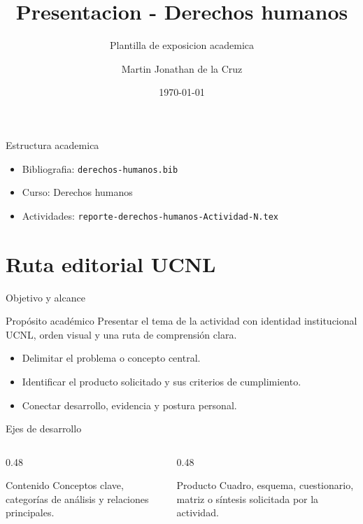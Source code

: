 ﻿\documentclass[spanish,aspectratio=169]{beamer}
\title{Presentacion - Derechos humanos}
\subtitle{Plantilla de exposicion academica}
\author{Martin Jonathan de la Cruz}
\institute{Universidad Ciudadana de Nuevo Leon}
\date{\today}
\begin{document}
\begin{frame}
  \titlepage
\end{frame}

\begin{frame}{Estructura academica}
  \begin{itemize}
    \item Bibliografia: \texttt{derechos-humanos.bib}
    \item Curso: Derechos humanos
    \item Actividades: \texttt{reporte-derechos-humanos-Actividad-N.tex}
  \end{itemize}
\end{frame}


\section{Ruta editorial UCNL}

\begin{frame}{Objetivo y alcance}
  \begin{block}{Propósito académico}
    Presentar el tema de la actividad con identidad institucional UCNL, orden visual y una ruta de comprensión clara.
  \end{block}
  \begin{itemize}
    \item Delimitar el problema o concepto central.
    \item Identificar el producto solicitado y sus criterios de cumplimiento.
    \item Conectar desarrollo, evidencia y postura personal.
  \end{itemize}
\end{frame}

\begin{frame}{Ejes de desarrollo}
  \begin{columns}[T,totalwidth=\textwidth]
    \begin{column}{0.48\textwidth}
      \begin{block}{Contenido}
        Conceptos clave, categorías de análisis y relaciones principales.
      \end{block}
    \end{column}
    \begin{column}{0.48\textwidth}
      \begin{block}{Producto}
        Cuadro, esquema, cuestionario, matriz o síntesis solicitada por la actividad.
      \end{block}
    \end{column}
  \end{columns}
\end{frame}
\end{document}
